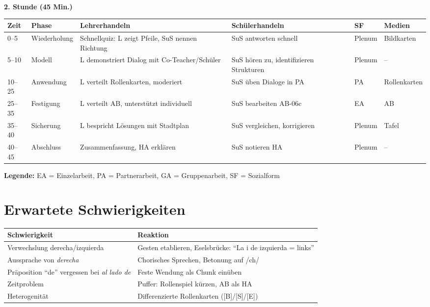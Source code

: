 \documentclass[11pt,a4paper]{article}
\begin{document}
\vspace{1em}

\textbf{2. Stunde (45 Min.)}

\begin{longtable}{|p{1cm}|p{1.5cm}|p{4cm}|p{3cm}|p{2cm}|p{2cm}|}
\hline
\textbf{Zeit} & \textbf{Phase} & \textbf{Lehrerhandeln} & \textbf{Schülerhandeln} & \textbf{SF} & \textbf{Medien} \\
\hline
\endhead

0--5 & Wiederholung & Schnellquiz: L zeigt Pfeile, SuS nennen Richtung & SuS antworten schnell & Plenum & Bildkarten \\
\hline

5--10 & Modell & L demonstriert Dialog mit Co-Teacher/Schüler & SuS hören zu, identifizieren Strukturen & Plenum & -- \\
\hline

10--25 & Anwendung & L verteilt Rollenkarten, moderiert & SuS üben Dialoge in PA & PA & Rollenkarten \\
\hline

25--35 & Festigung & L verteilt AB, unterstützt individuell & SuS bearbeiten AB-06c & EA & AB \\
\hline

35--40 & Sicherung & L bespricht Lösungen mit Stadtplan & SuS vergleichen, korrigieren & Plenum & Tafel \\
\hline

40--45 & Abschluss & Zusammenfassung, HA erklären & SuS notieren HA & Plenum & -- \\
\hline
\end{longtable}

\textbf{Legende:} EA = Einzelarbeit, PA = Partnerarbeit, GA = Gruppenarbeit, SF = Sozialform

\section{Erwartete Schwierigkeiten}

\begin{tabular}{|p{5cm}|p{8cm}|}
\hline
\textbf{Schwierigkeit} & \textbf{Reaktion} \\
\hline
Verwechslung derecha/izquierda & Gesten etablieren, Eselsbrücke: ``La i de izquierda = links'' \\
\hline
Aussprache von \textit{derecha} & Chorisches Sprechen, Betonung auf /ch/ \\
\hline
Präposition ``de'' vergessen bei \textit{al lado de} & Feste Wendung als Chunk einüben \\
\hline
Zeitproblem & Puffer: Rollenspiel kürzen, AB als HA \\
\hline
Heterogenität & Differenzierte Rollenkarten ([B]/[S]/[E]) \\
\hline
\end{tabular}
\end{document}
